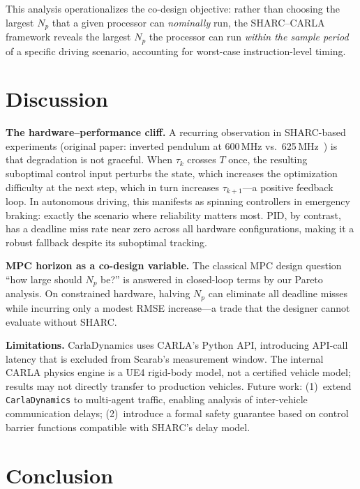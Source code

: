 \documentclass[conference]{IEEEtran}
\begin{document}
This analysis operationalizes the co-design objective: rather than
choosing the largest $N_p$ that a given processor can \emph{nominally}
run, the SHARC--CARLA framework reveals the largest $N_p$ the processor
can run \emph{within the sample period} of a specific driving scenario,
accounting for worst-case instruction-level timing.

\section{Discussion}\label{sec:discussion}

\noindent\textbf{The hardware--performance cliff.}
A recurring observation in SHARC-based experiments (original paper:
inverted pendulum at 600\,MHz vs.\ 625\,MHz~\cite{wintz2025sharc}) is
that degradation is not graceful.  When $\tau_k$ crosses $T$ once, the
resulting suboptimal control input perturbs the state, which increases
the optimization difficulty at the next step, which in turn increases
$\tau_{k+1}$—a positive feedback loop.  In autonomous driving, this
manifests as spinning controllers in emergency braking: exactly the
scenario where reliability matters most.  PID, by contrast, has a
deadline miss rate near zero across all hardware configurations, making
it a robust fallback despite its suboptimal tracking.

\noindent\textbf{MPC horizon as a co-design variable.}
The classical MPC design question ``how large should $N_p$ be?'' is
answered in closed-loop terms by our Pareto analysis.  On constrained
hardware, halving $N_p$ can eliminate all deadline misses while
incurring only a modest RMSE increase—a trade that the designer cannot
evaluate without SHARC.

\noindent\textbf{Limitations.}
CarlaDynamics uses CARLA's Python API, introducing API-call latency
that is excluded from Scarab's measurement window.  The internal CARLA
physics engine is a UE4 rigid-body model, not a certified vehicle
model; results may not directly transfer to production vehicles.
Future work: (1)~extend \texttt{CarlaDynamics} to multi-agent traffic,
enabling analysis of inter-vehicle communication delays; (2)~introduce
a formal safety guarantee based on control barrier functions compatible
with SHARC's delay model.

\section{Conclusion}\label{sec:conclusion}
\end{document}
